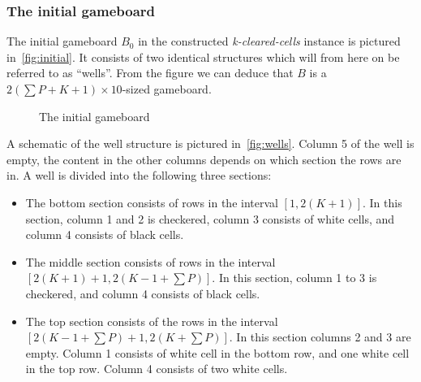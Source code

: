 \subsubsection{The initial gameboard}

The initial gameboard $B_0$ in the constructed \textit{k-cleared-cells} instance is pictured in~\autoref{fig:initial}. It consists of two identical structures which will from here on be referred to as ``wells''. From the figure we can deduce that $B$ is a $2 \left( \sum P + K + 1 \right) \times 10$-sized gameboard.

\begin{figure}[H]
    \centering
    \caption{The initial gameboard}
    \label{fig:initial}
\end{figure}

A schematic of the well structure is pictured in~\autoref{fig:wells}. Column 5 of the well is empty, the content in the other columns depends on which section the rows are in. A well is divided into the following three sections:

\begin{itemize}
\item The bottom section consists of rows in the interval $\left[ 1, 2 \left( K+1 \right) \right]$. In this section, column 1 and 2 is checkered, column 3 consists of white cells, and column 4 consists of black cells.

\item The middle section consists of rows in the interval $\left[ 2 \left( K+1 \right) +1, 2 \left( K-1 + \sum P \right) \right]$. In this section, column 1 to 3 is checkered, and column 4 consists of black cells.

\item The top section consists of the rows in the interval $\left[2 \left( K-1 + \sum P \right) +1, 2 \left( K + \sum P \right) \right]$. In this section columns 2 and 3 are empty. Column 1 consists of white cell in the bottom row, and one white cell in the top row. Column 4 consists of two white cells.

\end{itemize}

